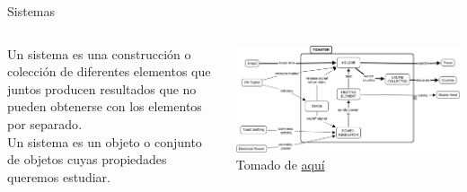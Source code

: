 \documentclass[aspectratio=169]{beamer}
\begin{document}
\begin{frame}{Sistemas}
    \begin{columns}[c, onlytextwidth]
        \begin{column}{0.5\textwidth}
        Un sistema es una construcción o colección de diferentes elementos que juntos producen resultados que no pueden obtenerse con los elementos por separado\cite{INCOSE}.\\[8pt]
        Un sistema es un objeto o conjunto de objetos cuyas propiedades queremos estudiar\cite{modelica}.
        \end{column}
        \begin{column}{0.5\textwidth}
            \begin{center}
               \includegraphics[width=\textwidth]{fig/tostadora.jpg}\\
               \tiny{Tomado de \href{https://deseng.ryerson.ca/dokuwiki/_detail/design:toasterarchitecture.jpg?id=design\%3Asystem_diagram}{aquí}}
            \end{center}
        \end{column}
    \end{columns}
\end{frame}
\end{document}
